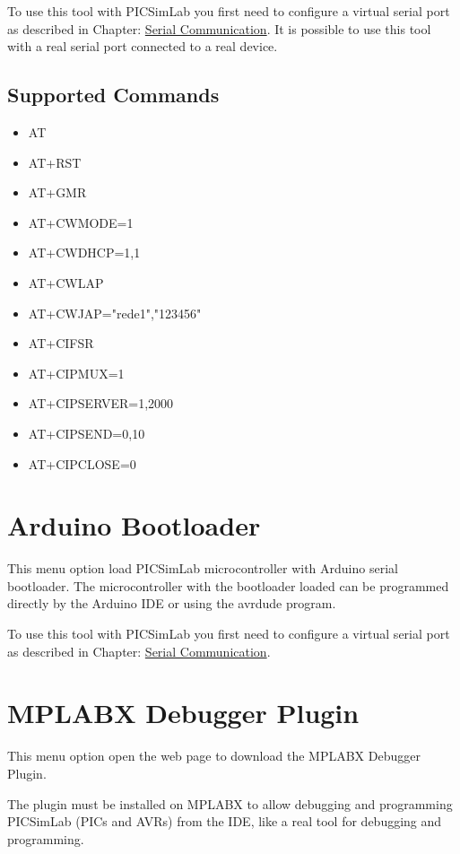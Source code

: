 To use this tool with PICSimLab you first need to configure a virtual serial port as described in Chapter: \hyperlink{def:seriali}{Serial Communication}.
It is possible to use this tool with a real serial port connected to a real device. 


\subsection{Supported Commands}

\begin{itemize}
\item AT
\item AT+RST
\item AT+GMR
\item AT+CWMODE=1
\item AT+CWDHCP=1,1
\item AT+CWLAP
\item AT+CWJAP="rede1","123456"
\item AT+CIFSR
\item AT+CIPMUX=1
\item AT+CIPSERVER=1,2000
\item AT+CIPSEND=0,10
\item AT+CIPCLOSE=0
\end{itemize}


\section{Arduino Bootloader}\hypertarget{def:aboot}{}

This menu option load PICSimLab microcontroller with Arduino serial bootloader.  
The microcontroller with the bootloader loaded can be programmed directly by the 
Arduino IDE or using the avrdude program. 

To use this tool with PICSimLab you first need to configure a virtual serial port as described in Chapter: \hyperlink{def:seriali}{Serial Communication}.


\section{MPLABX Debugger Plugin} \hypertarget{def:mpdebug}{}

This menu option open the web page to download the MPLABX Debugger Plugin.

The plugin must be installed on MPLABX to allow debugging and programming 
PICSimLab (PICs and AVRs) from the IDE, like a real tool for debugging and 
programming.

